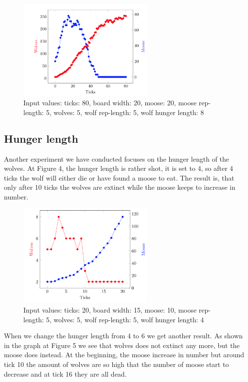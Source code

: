 \documentclass[a4paper]{report}
\begin{document}
\begin{figure}[H]
\centering
\includegraphics[width=0.60\textwidth]{Experiments/sim_board_b2} 
\caption{Input values: ticks: 80, board width: 20, moose: 20, moose rep-length: 5, wolves: 5, wolf rep-length: 5, wolf hunger length: 8}
\end{figure}

\subsection{Hunger length}

Another experiment we have conducted focuses on the hunger length of the wolves. At Figure 4, the hunger length is rather shot, it is set to 4, so after 4 ticks the wolf will either die or have found a moose to eat. The result is, that only after 10 ticks the wolves are extinct while the moose keeps to increase in number.

\begin{figure}[H]
\centering
\includegraphics[width=0.60\textwidth]{Experiments/sim_hunlen_a1}
\caption{Input values: ticks: 20, board width: 15, moose: 10, moose rep-length: 5, wolves: 5, wolf rep-length: 5, wolf hunger length: 4}
\end{figure}

When we change the hunger length from 4 to 6 we get another result. As shown in the graph at Figure 5 we see that wolves does not extinct any more, but the moose does instead. At the beginning, the moose increase in number but around tick 10 the amount of wolves are so high that the number of moose start to decrease and at tick 16 they are all dead.
\end{document}
